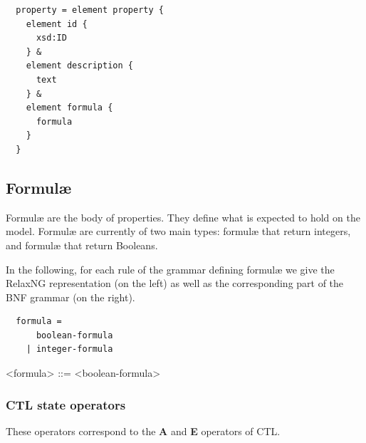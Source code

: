 \documentclass[10pt,english,a4paper]{article}
\newcommand\ctla             {\textbf{A}\xspace}
\newcommand\ctle             {\textbf{E}\xspace}
\begin{document}

\begin{lstlisting}
  property = element property {
    element id {
      xsd:ID
    } &
    element description {
      text
    } &
    element formula {
      formula
    }
  }
\end{lstlisting}


\subsection{Formul{\ae}}
Formul{\ae} are the body of properties.
They define what is expected to hold on the model.
Formul\ae{} are currently of two main types: formul{\ae} that return integers, and formul{\ae}
that return Booleans.

In the following, for each rule of the grammar defining formulæ we give the
RelaxNG representation (on the left) as well as the corresponding part of
the BNF grammar (on the right).

\begin{multicols}{2}
\begin{lstlisting}
  formula =
      boolean-formula
    | integer-formula
\end{lstlisting}
\columnbreak
\begin{grammar}
<formula> ::= <boolean-formula>
\end{grammar}
\end{multicols}

\subsubsection{CTL state operators}

These operators correspond to the \ctla and \ctle operators of CTL.
\end{document}
